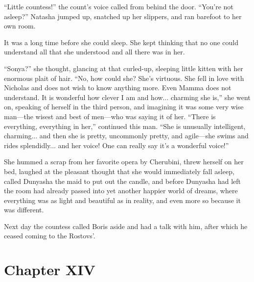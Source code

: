 ``Little countess!'' the count's voice called from behind the
door.  ``You're not asleep?'' Natasha jumped up, snatched up her
slippers, and ran barefoot to her own room.

It was a long time before she could sleep. She kept thinking that
no one could understand all that she understood and all there was
in her.

``Sonya?'' she thought, glancing at that curled-up, sleeping
little kitten with her enormous plait of hair. ``No, how could
she? She's virtuous. She fell in love with Nicholas and does not
wish to know anything more. Even Mamma does not understand. It is
wonderful how clever I am and how...  charming she is,'' she went
on, speaking of herself in the third person, and imagining it was
some very wise man---the wisest and best of men---who was saying
it of her. ``There is everything, everything in her,'' continued
this man. ``She is unusually intelligent, charming... and then
she is pretty, uncommonly pretty, and agile---she swims and rides
splendidly... and her voice! One can really say it's a wonderful
voice!''

She hummed a scrap from her favorite opera by Cherubini, threw
herself on her bed, laughed at the pleasant thought that she
would immediately fall asleep, called Dunyasha the maid to put
out the candle, and before Dunyasha had left the room had already
passed into yet another happier world of dreams, where everything
was as light and beautiful as in reality, and even more so
because it was different.

Next day the countess called Boris aside and had a talk with him,
after which he ceased coming to the Rostovs'.


\chapter*{Chapter XIV}
\ifaudio     
{} 
\fi

